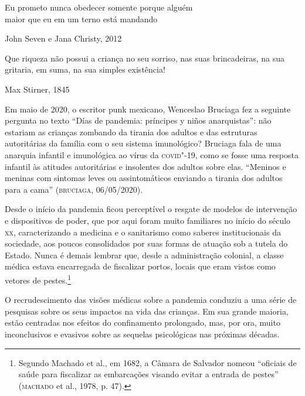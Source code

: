
\epigraph{Eu prometo nunca obedecer somente porque alguém\\
maior que eu em um terno está mandando}{John Seven e Jana Christy, 2012}

\epigraph{Que riqueza não possui a criança no seu sorriso, nas suas
brincadeiras, na sua gritaria, em suma, na sua simples existência!}{Max Stirner, 1845}

Em maio de 2020, o escritor punk mexicano, Wenceslao Bruciaga fez a
seguinte pergunta no texto ``Días de pandemia: príncipes y niños
anarquistas'': não estariam as crianças zombando da tirania dos adultos
e das estruturas autoritárias da família com o seu sistema imunológico?
Bruciaga fala de uma anarquia infantil e imunológica ao vírus da
\textsc{covid}"-19, como se fosse uma resposta infantil às atitudes autoritárias e
insolentes dos adultos sobre elas. ``Meninos e meninas com sintomas
leves ou assintomáticos enviando a tirania dos adultos para a cama''
(\textsc{bruciaga}, 06/05/2020).

Desde o início da pandemia ficou perceptível o resgate de modelos de
intervenção e dispositivos de poder, que por aqui foram muito familiares
no início do século \textsc{xx}, caracterizando a medicina e o sanitarismo como
saberes institucionais da sociedade, aos poucos consolidados por suas
formas de atuação sob a tutela do Estado. Nunca é demais lembrar que,
desde a administração colonial, a classe médica estava encarregada de
fiscalizar portos, locais que eram vistos como vetores de
pestes.\footnote{Segundo Machado et al., em 1682, a Câmara de Salvador
  nomeou ``oficiais de saúde para fiscalizar as embarcações visando
  evitar a entrada de pestes'' (\textsc{machado} et al., 1978, p. 47).}

O recrudescimento das visões médicas sobre a pandemia conduziu a uma
série de pesquisas sobre os seus impactos na vida das crianças. Em sua
grande maioria, estão centradas nos efeitos do confinamento prolongado,
mas, por ora, muito inconclusivos e evasivos sobre as sequelas
psicológicas nas próximas décadas.

